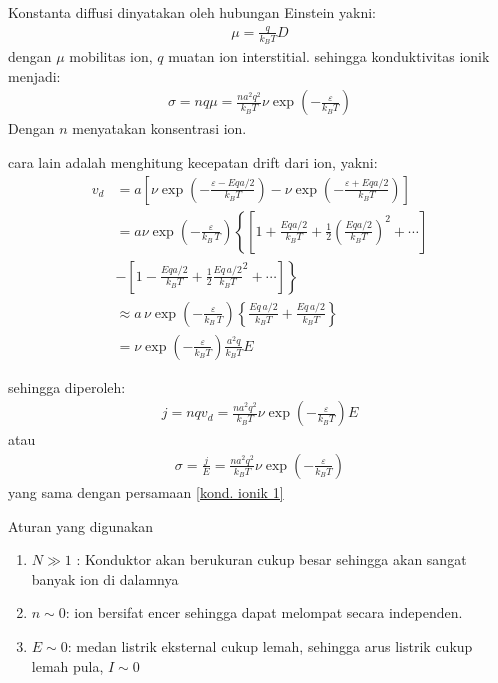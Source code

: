 \documentclass[t]{beamer}
\begin{document}
 \begin{frame}

 Konstanta diffusi dinyatakan  oleh hubungan Einstein yakni:
 \begin{align}
 \mu = \frac{q}{k_B T} D
 \end{align}
 dengan  $\mu$ mobilitas ion,   $q$ muatan ion interstitial. sehingga  konduktivitas ionik menjadi:
 \begin{align}
 \sigma  =  n q \mu  =  \frac{n a^2  q^2 }{k_B T}  \nu \exp  \left(  - \frac{\varepsilon}{k_B T}\right) \label{kond. ionik 1}
 \end{align}
 Dengan  $n$ menyatakan konsentrasi ion. 

 \end{frame}
 \begin{frame}
  cara lain adalah menghitung  kecepatan drift dari ion, yakni:
    \begin{align}
    v_d&  = a \left[  \nu \exp \left(  - \frac{\varepsilon - Eqa/2}{k_B T}\right)  - \nu  \exp \left( - \frac{\varepsilon +  Eq  a/2 }{k_B T } \right)\right ] \nonumber   \\  
    & = a \nu \exp \left(  - \frac{\varepsilon}{k_B \, T}\right)  \left\{ \left[ 1+ \frac{Eqa/2}{k_B T}  + \frac{1}{2} \left( \frac{Eq a/2}{k_B T}\right)^2 + \cdots \right] \right.  \nonumber \\
    &\left.  - \left[ 1 - \frac{E q a/2}{k_B T} + \frac{1}{2} \frac{Eq \, a/2}{k_B T}^2 + \cdots  \right] \right\} \nonumber \\
    & \approx a \, \nu \exp \left( - \frac{\varepsilon }{k_B \, T}\right ) \left\{ \frac{Eq \, a/2}{k_B T}  + \frac{Eq \, a/2}{k_B T}\right \} 
     \nonumber \\
    & =  \nu \exp \left( - \frac{\varepsilon}{k_B T }\right)  \frac{a^2  q}{k_B T} E
    \end{align}
 \end{frame}
 
 \begin{frame}
  sehingga  diperoleh:
     \begin{align}
      j =  nq  v_d =   \frac{n a^2  q^2 }{ k_B T} \nu  \exp  \left(  - \frac{ \varepsilon}{k_B T } \right) E
     \end{align}
atau
\begin{align}
\sigma = \frac{j}{E}  =   \frac{n a^2  q^2 }{k_B T}  \nu \exp  \left(  - \frac{\varepsilon}{k_B T}\right)
\end{align}
yang sama dengan persamaan \ref{kond. ionik 1}
 \end{frame}
 \begin{frame} 
Aturan yang digunakan
 \begin{enumerate}
 \item $N \gg  1$ : Konduktor akan berukuran cukup besar sehingga akan sangat banyak ion di dalamnya
 \item $ n \sim 0 $: ion bersifat encer sehingga dapat melompat secara independen. 
 \item $E \sim  0$: medan listrik eksternal cukup lemah, sehingga arus listrik cukup lemah pula, $I \sim  0 $
 \end{enumerate}
 \end{frame}
 
\end{document}
